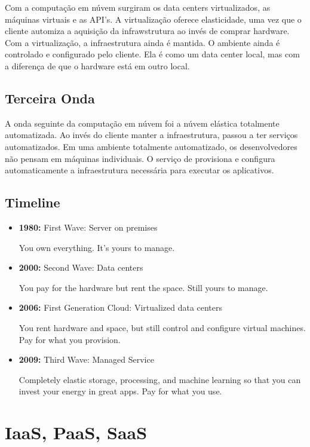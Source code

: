 \documentclass[
]{book}
\begin{document}
Com a computação em núvem surgiram os data centers virtualizados, as máquinas
virtuais e as API's. A virtualização oferece elasticidade, uma vez que o
cliente automiza a aquisição da infrawstrutura ao invés de comprar hardware.
Com a virtualização, a infraestrutura ainda é mantida. O ambiente ainda é
controlado e configurado pelo cliente. Ela é como um data center local, mas
com a diferença de que o hardware está em outro local.

\hypertarget{terceira-onda}{%
\subsection{Terceira Onda}\label{terceira-onda}}

A onda seguinte da computação em núvem foi a núvem elástica totalmente automatizada.
Ao invés do cliente manter a infraestrutura, passou a ter serviços automatizados.
Em uma ambiente totalmente automatizado, os desenvolvedores não pensam em máquinas
individuais. O serviço de provisiona e configura automaticamente a infraestrutura
necessária para executar os aplicativos.

\hypertarget{timeline}{%
\subsection{Timeline}\label{timeline}}

\begin{itemize}
\item
  \textbf{1980:} First Wave: Server on premises

  You own everything. It's yours to manage.
\item
  \textbf{2000:} Second Wave: Data centers

  You pay for the hardware but rent the space. Still yours to manage.
\item
  \textbf{2006:} First Generation Cloud: Virtualized data centers

  You rent hardware and space, but still control and configure virtual machines.
  Pay for what you provision.
\item
  \textbf{2009:} Third Wave: Managed Service

  Completely elastic storage, processing, and machine learning so that you
  can invest your energy in great apps. Pay for what you use.
\end{itemize}

\hypertarget{iaas-paas-saas}{%
\section{IaaS, PaaS, SaaS}\label{iaas-paas-saas}}
\end{document}
